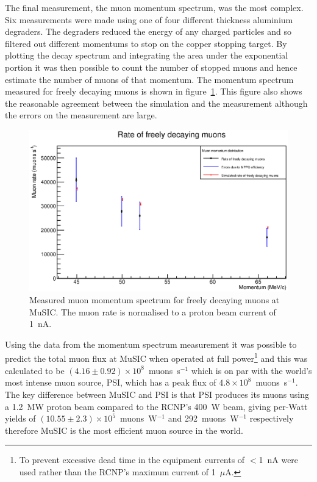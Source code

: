 The final measurement, the muon momentum spectrum, was the most complex. Six measurements were made using one of four different thickness aluminium degraders. The degraders reduced the energy of any charged particles and so filtered out different momentums to stop on the copper stopping target. By plotting the decay spectrum and integrating the area under the exponential portion it was then possible to count the number of stopped muons and hence estimate the number of muons of that momentum. The momentum spectrum measured for freely decaying muons is shown in figure~\ref{fig:exec_summary_muon_momentum_spectrum}. This figure also shows the reasonable agreement between the simulation and the measurement although the errors on the measurement are large. 

\begin{figure}[htpb]
  \centering
    \includegraphics[width=.9\textwidth]{../3_measurements/images/plot_generating_scripts/adjusted_muon_rates_exec_summary_version.eps}
  \caption{Measured muon momentum spectrum for freely decaying muons at MuSIC. The muon rate is normalised to a proton beam current of 1~nA.}
  \label{fig:exec_summary_muon_momentum_spectrum}
\end{figure}

Using the data from the momentum spectrum measurement it was possible to predict the total muon flux at MuSIC when operated at full power\footnote{To prevent excessive dead time in the equipment currents of \(<\)1~nA were used rather than the RCNP's maximum current of 1~\(\mu\)A.} and this was calculated to be \((4.16\pm0.92)\times10^8\)~muons~s\(^{-1}\) which is on par with the world's most intense muon source, PSI, which has a peak flux of \(4.8\times10^8\)~muons~s\(^{-1}\). The key difference between MuSIC and PSI is that PSI produces its muons using a 1.2~MW proton beam compared to the RCNP's 400~W beam, giving per-Watt yields of \((10.55\pm2.3)\times10^5\)~muons~W\(^{-1}\) and 292~muons~W\(^{-1}\) respectively therefore MuSIC is the most efficient muon source in the world.

